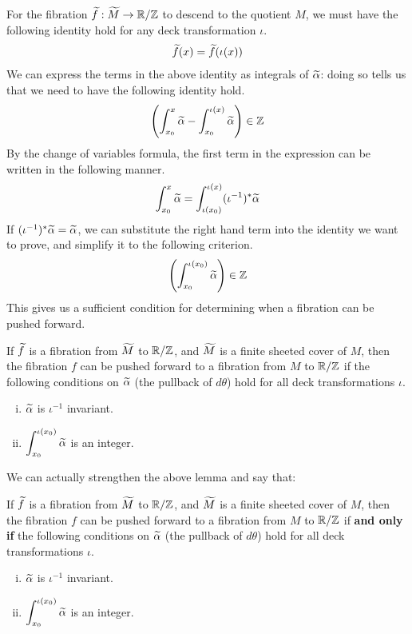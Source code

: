 For the fibration $\widetilde{f}: \widetilde{M} \to \mathbb{R}/\mathbb{Z}$ to descend to the quotient $M$, we must have the
following identity hold for any deck transformation $\iota$.
\begin{align*}
  \widetilde{f}(x) = \widetilde{f}(\iota(x))
\end{align*}
We can express the terms in the above identity as integrals of $\widetilde{\alpha}$: doing so tells us that
we need to have the following identity hold.
\begin{align*}
  \left(   \int_{x_0}^x \widetilde{\alpha} - \int_{x_0}^{\iota(x)} \widetilde{\alpha}\right) \in \mathbb{Z}
\end{align*}
By the change of variables formula, the first term in the expression can be written in the
following manner.
\begin{align*}
  \int_{x_0}^x \widetilde{\alpha} = \int_{\iota(x_0)}^{\iota(x)} (\iota^{-1})^{\ast} \widetilde{\alpha}
\end{align*}
If $( \iota^{-1})^{\ast}\widetilde{\alpha} = \widetilde{\alpha}$, we can substitute the right hand term into the identity we want
to prove, and simplify it to the following criterion.
\begin{align*}
  \left(   \int_{x_0}^{\iota(x_0)} \widetilde{\alpha}\right) \in \mathbb{Z}
\end{align*}
This gives us a sufficient condition for determining when a fibration can be pushed forward.
\begin{lem}
  If $\widetilde{f}$ is a fibration from $\widetilde{M}$ to $\mathbb{R}/\mathbb{Z}$, and $\widetilde{M}$ is a finite sheeted cover of
  $M$, then the fibration $f$ can be pushed forward to a fibration from $M$ to $\mathbb{R}/\mathbb{Z}$ if the
  following conditions on $\widetilde{\alpha}$ (the pullback of $d\theta$) hold for all deck
  transformations $\iota$.
  \begin{enumerate}[(i)]
  \item $\widetilde{\alpha}$ is $\iota^{-1}$ invariant.
  \item $\displaystyle \int_{x_0}^{\iota(x_0)} \widetilde{\alpha}$ is an integer.
  \end{enumerate}
\end{lem}

We can actually strengthen the above lemma and say that:

\begin{lem}
  If $\widetilde{f}$ is a fibration from $\widetilde{M}$ to $\mathbb{R}/\mathbb{Z}$, and $\widetilde{M}$ is a finite sheeted cover of
  $M$, then the fibration $f$ can be pushed forward to a fibration from $M$ to $\mathbb{R}/\mathbb{Z}$ if \textbf{and only if} the
  following conditions on $\widetilde{\alpha}$ (the pullback of $d\theta$) hold for all deck
  transformations $\iota$.
  \begin{enumerate}[(i)]
  \item $\widetilde{\alpha}$ is $\iota^{-1}$ invariant.
  \item $\displaystyle \int_{x_0}^{\iota(x_0)} \widetilde{\alpha}$ is an integer.
  \end{enumerate}
\end{lem}


